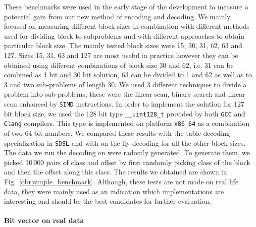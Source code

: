 These benchmarks were used in the early stage of the development to measure a potential gain from
our new method of encoding and decoding. We mainly focused on measuring different block sizes
in combination with different methods used for dividing block to subproblems and with different
approaches to obtain particular block size. The mainly tested block sizes were 15, 30, 31, 62, 63
and 127. Sizes 15, 31, 63 and 127 are most useful in practice however they can be obtained using
different combinations of block size 30 and 62, i.e. 31 can be combined as 1 bit and 30 bit solution,
63 can be divided to 1 and 62 as well as to 3 and two sub-problems of length 30.
We used 3 different techniques to divide a problem into sub-problems, these were the linear scan,
binary search and linear scan enhanced by \texttt{SIMD} instructions. In order to implement the
solution for 127 bit block size, we used the 128 bit type \texttt{\_\_uint128\_t} provided by both
\texttt{GCC} and \texttt{Clang} compilers. This type is implemented on platform \texttt{x86\_64}
as a combination of two 64 bit numbers. We compared these results with the table decoding specialization
in \texttt{SDSL} and with on the fly decoding for all the other block sizes. The data we run the decoding
on were radomly generated. To generate them, we picked 10\,000 pairs of class and offset by first randomly
picking class of the block and then the offset along this class. The results we obtained are shown in
Fig.~\ref{obr:simple_benchmark}. Although, these tests are not made on real life data, they were mainly
used as an indication which implementations are interesting and should be the best candidates for further
evaluation.  

\paragraph{Bit vector on real data}

